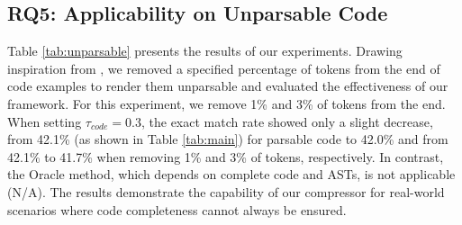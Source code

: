 \subsection{RQ5: Applicability on Unparsable Code}\label{sec:rq4}



Table \ref{tab:unparsable} presents the results of our experiments. Drawing inspiration from \citealp{learning}, we removed a specified percentage of tokens from the end of code examples to render them unparsable and evaluated the effectiveness of our framework. For this experiment, we remove 1\% and 3\% of tokens from the end. When setting $\tau_{code}=0.3$, the exact match rate showed only a slight decrease, from 42.1\% (as shown in Table \ref{tab:main}) for parsable code to 42.0\% and from 42.1\% to 41.7\% when removing 1\% and 3\% of tokens, respectively. In contrast, the Oracle method, which depends on complete code and ASTs, is not applicable (N/A). The results demonstrate the capability of our compressor for real-world scenarios where code completeness cannot always be ensured.


